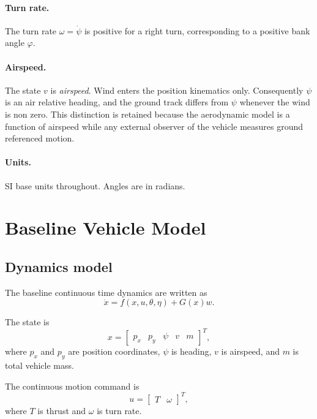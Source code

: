 \documentclass[11pt,a4paper]{article}
\newcommand{\vecx}{x}
\newcommand{\vecu}{u}
\newcommand{\vecw}{w}
\newcommand{\vectheta}{\theta}
\newcommand{\veceta}{\eta}
\newcommand{\vecf}{f}
\newcommand{\matG}{G}
\begin{document}
\paragraph{Turn rate.}
The turn rate $\omega = \dot\psi$ is positive for a right turn, corresponding to
a positive bank angle $\varphi$.

\paragraph{Airspeed.}
The state $v$ is \emph{airspeed}. Wind enters the position kinematics only.
Consequently $\psi$ is an air relative heading, and the ground track differs from
$\psi$ whenever the wind is non zero. This distinction is retained because the
aerodynamic model is a function of airspeed while any external observer of the
vehicle measures ground referenced motion.

\paragraph{Units.}
SI base units throughout. Angles are in radians.

\section{Baseline Vehicle Model}

\subsection{Dynamics model}

The baseline continuous time dynamics are written as
\begin{equation}
  \dot{\vecx} = \vecf(\vecx, \vecu, \vectheta, \veceta) + \matG(\vecx)\vecw .
  \label{eq:baseline-dynamics}
\end{equation}

The state is
\begin{equation}
  \vecx = \begin{bmatrix} p_x & p_y & \psi & v & m \end{bmatrix}^{T},
\end{equation}
where $p_x$ and $p_y$ are position coordinates, $\psi$ is heading, $v$ is
airspeed, and $m$ is total vehicle mass.

The continuous motion command is
\begin{equation}
  \vecu = \begin{bmatrix} T & \omega \end{bmatrix}^{T},
\end{equation}
where $T$ is thrust and $\omega$ is turn rate.
\end{document}
